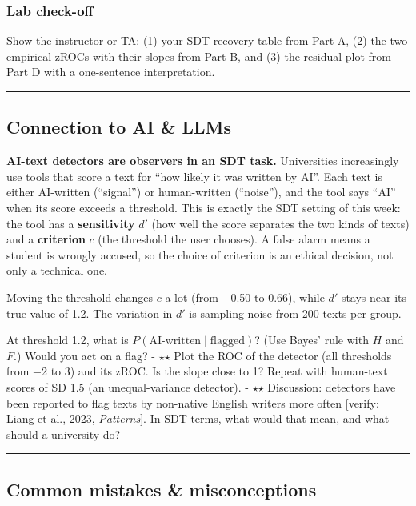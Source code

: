 \subsubsection{Lab check-off}

Show the instructor or TA: (1) your SDT recovery table from Part A, (2)
the two empirical zROCs with their slopes from Part B, and (3) the
residual plot from Part D with a one-sentence interpretation.

\begin{center}\rule{0.5\linewidth}{0.5pt}\end{center}

\subsection{Connection to AI \& LLMs}

\textbf{AI-text detectors are observers in an SDT task.} Universities
increasingly use tools that score a text for ``how likely it was written
by AI''. Each text is either AI-written (``signal'') or human-written
(``noise''), and the tool says ``AI'' when its score exceeds a
threshold. This is exactly the SDT setting of this week: the tool has a
\textbf{sensitivity} \(d'\) (how well the score separates the two kinds
of texts) and a \textbf{criterion} \(c\) (the threshold the user
chooses). A false alarm means a student is wrongly accused, so the
choice of criterion is an ethical decision, not only a technical one.

Moving the threshold changes \(c\) a lot (from −0.50 to 0.66), while
\(d'\) stays near its true value of 1.2. The variation in \(d'\) is
sampling noise from 200 texts per group.

At threshold 1.2, what is \(P(\text{AI-written} \mid \text{flagged})\)?
(Use Bayes' rule with \(H\) and \(F\).) Would you act on a flag? - \ensuremath{\star}\ensuremath{\star}
Plot the ROC of the detector (all thresholds from −2 to 3) and its zROC.
Is the slope close to 1? Repeat with human-text scores of SD 1.5 (an
unequal-variance detector). - \ensuremath{\star}\ensuremath{\star} Discussion: detectors have been
reported to flag texts by non-native English writers more often
{[}verify: Liang et al., 2023, \emph{Patterns}{]}. In SDT terms, what
would that mean, and what should a university do?

\begin{center}\rule{0.5\linewidth}{0.5pt}\end{center}

\subsection{Common mistakes \& misconceptions}

